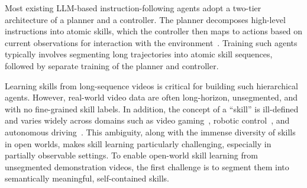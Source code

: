 Most existing LLM-based instruction-following agents adopt a two-tier architecture of a planner and a controller. The planner decomposes high-level instructions into atomic skills, which the controller then maps to actions based on current observations for interaction with the environment~\citep{omnijarvis,deps,jarvis-1,li2024optimus,voyager,cheng2024exploring}. Training such agents typically involves segmenting long trajectories into atomic skill sequences, followed by separate training of the planner and controller. 

Learning skills from long-sequence videos is critical for building such hierarchical agents. 
However, real-world video data are often long-horizon, unsegmented, and with no fine-grained skill labels.
In addition, the concept of a ``skill'' is ill-defined and varies widely across domains such as video gaming~\citep{groot1,voyager,mastering,proagent}, robotic control~\citep{rt-2}, and autonomous driving~\citep{auto-driving}. This ambiguity, along with the immense diversity of skills in open worlds, makes skill learning particularly challenging, especially in partially observable settings. To enable open-world skill learning from unsegmented demonstration videos, the first challenge is to segment them into semantically meaningful, self-contained skills. %

